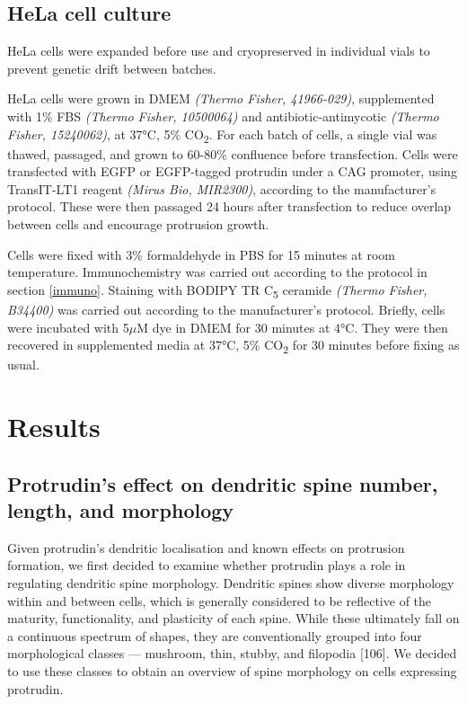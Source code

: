 \documentclass[
  12pt,
  a4paper,
]{book}
\begin{document}
\hypertarget{hela-cell-culture}{%
\subsection{HeLa cell culture}\label{hela-cell-culture}}

HeLa cells were expanded before use and cryopreserved in individual vials to prevent genetic drift between batches.

HeLa cells were grown in DMEM \emph{(Thermo Fisher, 41966-029)}, supplemented with 1\% FBS \emph{(Thermo Fisher, 10500064)} and antibiotic-antimycotic \emph{(Thermo Fisher, 15240062)}, at 37°C, 5\% CO\textsubscript{2}. For each batch of cells, a single vial was thawed, passaged, and grown to 60-80\% confluence before transfection. Cells were transfected with EGFP or EGFP-tagged protrudin under a CAG promoter, using TransIT-LT1 reagent \emph{(Mirus Bio, MIR2300)}, according to the manufacturer's protocol. These were then passaged 24 hours after transfection to reduce overlap between cells and encourage protrusion growth.

Cells were fixed with 3\% formaldehyde in PBS for 15 minutes at room temperature. Immunochemistry was carried out according to the protocol in section \ref{immuno}. Staining with BODIPY TR C\textsubscript{5} ceramide \emph{(Thermo Fisher, B34400)} was carried out according to the manufacturer's protocol. Briefly, cells were incubated with 5\(\mu\)M dye in DMEM for 30 minutes at 4°C. They were then recovered in supplemented media at 37°C, 5\% CO\textsubscript{2} for 30 minutes before fixing as usual.

\hypertarget{results-1}{%
\section{Results}\label{results-1}}

\hypertarget{protrudins-effect-on-dendritic-spine-number-length-and-morphology}{%
\subsection{Protrudin's effect on dendritic spine number, length, and morphology}\label{protrudins-effect-on-dendritic-spine-number-length-and-morphology}}

Given protrudin's dendritic localisation and known effects on protrusion formation, we first decided to examine whether protrudin plays a role in regulating dendritic spine morphology. Dendritic spines show diverse morphology within and between cells, which is generally considered to be reflective of the maturity, functionality, and plasticity of each spine. While these ultimately fall on a continuous spectrum of shapes, they are conventionally grouped into four morphological classes --- mushroom, thin, stubby, and filopodia {[}106{]}. We decided to use these classes to obtain an overview of spine morphology on cells expressing protrudin.
\end{document}
